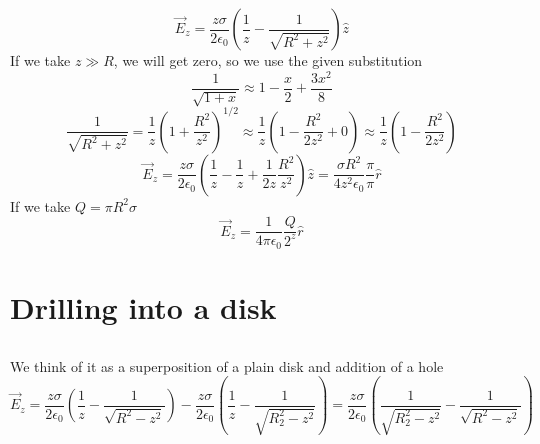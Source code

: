 \documentclass{article}
\begin{document}
\[
	\vec{E}_z = \frac{z \sigma}{2 \epsilon_0}
	( \frac{1}{z} - \frac{1}{\sqrt{R^2+z^2}} ) \hat{z}
\]
If we take \(z \gg R\), we will get zero, so we use the given substitution
\[
	\frac{1}{\sqrt{1 + x}} \approx 1 - \frac{x}{2} + \frac{3 x^2}{8}
\]
\[
	\frac{1}{\sqrt{R^2+z^2}} = \frac{1}{z} (1 + \frac{R^2}{z^2})^{1/2}
	\approx \frac{1}{z} (1 - \frac{R^2}{2 z^2} + 0)
	\approx \frac{1}{z} (1 - \frac{R^2}{2 z^2})
\]
\[
	\vec{E}_z = \frac{z \sigma}{2 \epsilon_0}
	( \frac{1}{z} - \frac{1}{z}  + \frac{1}{2 z} \frac{R^2}{z^2}) \hat{z}
	= \frac{\sigma R^2}{4 z^2 \epsilon_0} \frac{\pi}{\pi} \hat{r}
\]
If we take \(Q = \pi R^2 \sigma\)
\[
	\vec{E}_z = \frac{1}{4 \pi \epsilon_0} \frac{Q}{2^z} \hat{r}
\]

\section{Drilling into a disk}

\subsection{}

We think of it as a superposition of a plain disk and addition of a hole
\[
	\vec{E}_z = \frac{z \sigma}{2 \epsilon_0}
	( \frac{1}{z} - \frac{1}{\sqrt{R^2 - z^2}} ) -
	\frac{z \sigma}{2 \epsilon_0}
	( \frac{1}{z} - \frac{1}{\sqrt{R_2^2 - z^2}} )
	= \frac{z \sigma}{2 \epsilon_0}
	( \frac{1}{\sqrt{R_2^2 - z^2}} - \frac{1}{\sqrt{R^2 - z^2}} )
\]

\subsection{}
\end{document}

